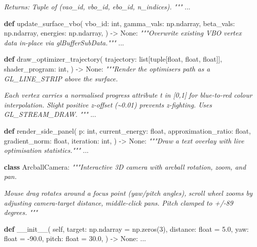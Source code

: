 \documentclass[
  11pt,
]{report}
\newenvironment{Shaded}{}{}
\newcommand{\BuiltInTok}[1]{\textcolor[rgb]{0.00,0.50,0.00}{#1}}
\newcommand{\CommentTok}[1]{\textcolor[rgb]{0.38,0.63,0.69}{\textit{#1}}}
\newcommand{\DecValTok}[1]{\textcolor[rgb]{0.25,0.63,0.44}{#1}}
\newcommand{\FloatTok}[1]{\textcolor[rgb]{0.25,0.63,0.44}{#1}}
\newcommand{\FunctionTok}[1]{\textcolor[rgb]{0.02,0.16,0.49}{#1}}
\newcommand{\KeywordTok}[1]{\textcolor[rgb]{0.00,0.44,0.13}{\textbf{#1}}}
\newcommand{\NormalTok}[1]{#1}
\newcommand{\OperatorTok}[1]{\textcolor[rgb]{0.40,0.40,0.40}{#1}}
\newcommand{\VariableTok}[1]{\textcolor[rgb]{0.10,0.09,0.49}{#1}}
\begin{document}
\begin{Shaded}
\begin{Highlighting}[]
\CommentTok{    Returns:}
\CommentTok{        Tuple of (vao\_id, vbo\_id, ebo\_id, n\_indices).}
\CommentTok{    """}
\NormalTok{    ...}


\KeywordTok{def}\NormalTok{ update\_surface\_vbo(}
\NormalTok{    vbo\_id: }\BuiltInTok{int}\NormalTok{,}
\NormalTok{    gamma\_vals: np.ndarray,}
\NormalTok{    beta\_vals: np.ndarray,}
\NormalTok{    energies: np.ndarray,}
\NormalTok{) }\OperatorTok{{-}\textgreater{}} \VariableTok{None}\NormalTok{:}
    \CommentTok{"""Overwrite existing VBO vertex data in{-}place via glBufferSubData."""}
\NormalTok{    ...}


\KeywordTok{def}\NormalTok{ draw\_optimizer\_trajectory(}
\NormalTok{    trajectory: }\BuiltInTok{list}\NormalTok{[}\BuiltInTok{tuple}\NormalTok{[}\BuiltInTok{float}\NormalTok{, }\BuiltInTok{float}\NormalTok{, }\BuiltInTok{float}\NormalTok{]],}
\NormalTok{    shader\_program: }\BuiltInTok{int}\NormalTok{,}
\NormalTok{) }\OperatorTok{{-}\textgreater{}} \VariableTok{None}\NormalTok{:}
    \CommentTok{"""Render the optimiser\textquotesingle{}s path as a GL\_LINE\_STRIP above the surface.}

\CommentTok{    Each vertex carries a normalised progress attribute t in [0,1]}
\CommentTok{    for blue{-}to{-}red colour interpolation. Slight positive z{-}offset}
\CommentTok{    (\textasciitilde{}0.01) prevents z{-}fighting. Uses GL\_STREAM\_DRAW.}
\CommentTok{    """}
\NormalTok{    ...}


\KeywordTok{def}\NormalTok{ render\_side\_panel(}
\NormalTok{    p: }\BuiltInTok{int}\NormalTok{,}
\NormalTok{    current\_energy: }\BuiltInTok{float}\NormalTok{,}
\NormalTok{    approximation\_ratio: }\BuiltInTok{float}\NormalTok{,}
\NormalTok{    gradient\_norm: }\BuiltInTok{float}\NormalTok{,}
\NormalTok{    iteration: }\BuiltInTok{int}\NormalTok{,}
\NormalTok{) }\OperatorTok{{-}\textgreater{}} \VariableTok{None}\NormalTok{:}
    \CommentTok{"""Draw a text overlay with live optimisation statistics."""}
\NormalTok{    ...}


\KeywordTok{class}\NormalTok{ ArcballCamera:}
    \CommentTok{"""Interactive 3D camera with arcball rotation, zoom, and pan.}

\CommentTok{    Mouse drag rotates around a focus point (yaw/pitch angles),}
\CommentTok{    scroll wheel zooms by adjusting camera{-}target distance,}
\CommentTok{    middle{-}click pans. Pitch clamped to +/{-}89 degrees.}
\CommentTok{    """}

    \KeywordTok{def} \FunctionTok{\_\_init\_\_}\NormalTok{(}
        \VariableTok{self}\NormalTok{,}
\NormalTok{        target: np.ndarray }\OperatorTok{=}\NormalTok{ np.zeros(}\DecValTok{3}\NormalTok{),}
\NormalTok{        distance: }\BuiltInTok{float} \OperatorTok{=} \FloatTok{5.0}\NormalTok{,}
\NormalTok{        yaw: }\BuiltInTok{float} \OperatorTok{=} \OperatorTok{{-}}\FloatTok{90.0}\NormalTok{,}
\NormalTok{        pitch: }\BuiltInTok{float} \OperatorTok{=} \FloatTok{30.0}\NormalTok{,}
\NormalTok{    ) }\OperatorTok{{-}\textgreater{}} \VariableTok{None}\NormalTok{:}
\NormalTok{        ...}


\end{Highlighting}
\end{Shaded}
\end{document}
